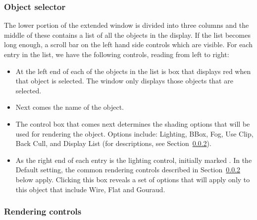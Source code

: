 \subsubsection{Object selector}

The lower portion of the extended \viewer{} window is divided into three
columns and the middle of these contains a list of all the objects in the
display.  If the list becomes long enough, a scroll bar on the left
hand side controls which are visible.  For each entry in the list, we have
the following controls, reading from left to right:

\begin{itemize}
  \item At the left end of each of the
        objects in the list is box that displays red when that object is
        selected.  The \viewer{} window only displays those objects that
        are selected.
  \item Next comes the name of the object.
  \item The  control box that comes next determines the
        shading options that will be used for rendering the object.
        Options include: Lighting, BBox, Fog, Use Clip, Back Cull, and
        Display List (for descriptions, see
        Section~\ref{sec:view-rendering}).
  \item As the right end of each entry is the lighting control, initially
        marked .  In the Default setting, the common
        rendering controls described in Section~\ref{sec:view-rendering}
        below apply.  Clicking this box reveals a set of options that will
        apply only to this object that include Wire, Flat and Gouraud.
\end{itemize}


\subsubsection{Rendering controls}
\label{sec:view-rendering} 

